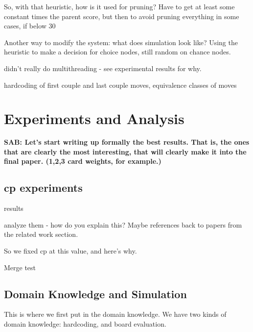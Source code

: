 \documentclass[letterpaper]{article}
\begin{document}
So, with that heuristic, how is it used for pruning? Have to get at least some constant times the parent score, but then to avoid pruning everything in some cases, if below 30%

Another way to modify the system: what does simulation look like? Using the heuristic to make a decision for choice nodes, still random on chance nodes.

didn't really do multithreading - see experimental results for why.

hardcoding of first couple and last couple moves, equivalence classes of moves

\section{Experiments and Analysis}

{\bf SAB: Let's start writing up formally the best results. That is, the ones that are clearly the most interesting, that will clearly make it into the final paper. (1,2,3 card weights, for example.)}

\subsection{cp experiments}

results

analyze them - how do you explain this? Maybe references back to papers from the related work section.

So we fixed cp at this value, and here's why.

Merge test

\subsection{Domain Knowledge and Simulation}

This is where we first put in the domain knowledge.
We have two kinds of domain knowledge: hardcoding, and board evaluation.
\end{document}

